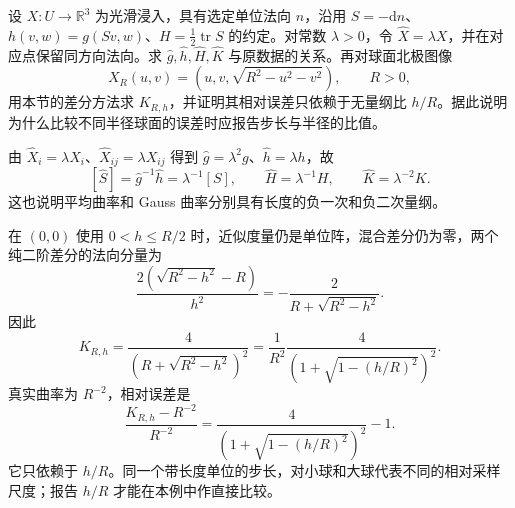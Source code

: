 \begin{exercise}\label{g1:ex:curvature-under-scaling}
	设 \(X:U\to\mathbb R^3\) 为光滑浸入，具有选定单位法向 \(n\)，沿用 \(S=-\mathrm{d}n\)、\(h(v,w)=g(Sv,w)\)、\(H=\tfrac12\operatorname{tr}S\) 的约定。对常数 \(\lambda>0\)，令 \(\widehat X=\lambda X\)，并在对应点保留同方向法向。求 \(\widehat g,\widehat h,\widehat H,\widehat K\) 与原数据的关系。再对球面北极图像
	\[
		X_R(u,v)=(u,v,\sqrt{R^2-u^2-v^2}),\qquad R>0,
	\]
	用本节的差分方法求 \(K_{R,h}\)，并证明其相对误差只依赖于无量纲比 \(h/R\)。据此说明为什么比较不同半径球面的误差时应报告步长与半径的比值。
\end{exercise}
\begin{solution}
	由 \(\widehat X_i=\lambda X_i\)、\(\widehat X_{ij}=\lambda X_{ij}\) 得到 \(\widehat g=\lambda^2g\)、\(\widehat h=\lambda h\)，故
	\[
		[\widehat S]=\widehat g^{-1}\widehat h=\lambda^{-1}[S],\qquad
		\widehat H=\lambda^{-1}H,\qquad \widehat K=\lambda^{-2}K.
	\]
	这也说明平均曲率和 Gauss 曲率分别具有长度的负一次和负二次量纲。

	在 \((0,0)\) 使用 \(0<h\le R/2\) 时，近似度量仍是单位阵，混合差分仍为零，两个纯二阶差分的法向分量为
	\[
		\frac{2(\sqrt{R^2-h^2}-R)}{h^2}
		=-\frac2{R+\sqrt{R^2-h^2}}.
	\]
	因此
	\[
		K_{R,h}=\frac4{(R+\sqrt{R^2-h^2})^2}
		=\frac1{R^2}\frac4{(1+\sqrt{1-(h/R)^2})^2}.
	\]
	真实曲率为 \(R^{-2}\)，相对误差是
	\[
		\frac{K_{R,h}-R^{-2}}{R^{-2}}
		=\frac4{(1+\sqrt{1-(h/R)^2})^2}-1.
	\]
	它只依赖于 \(h/R\)。同一个带长度单位的步长，对小球和大球代表不同的相对采样尺度；报告 \(h/R\) 才能在本例中作直接比较。
\end{solution}
